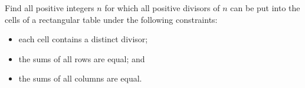 Find all positive integers $n$ for which all positive divisors of $n$ can be put into the cells of a rectangular table under the following constraints:
\begin{itemize}
\item each cell contains a distinct divisor;
\item the sums of all rows are equal; and
\item the sums of all columns are equal.
\end{itemize}
